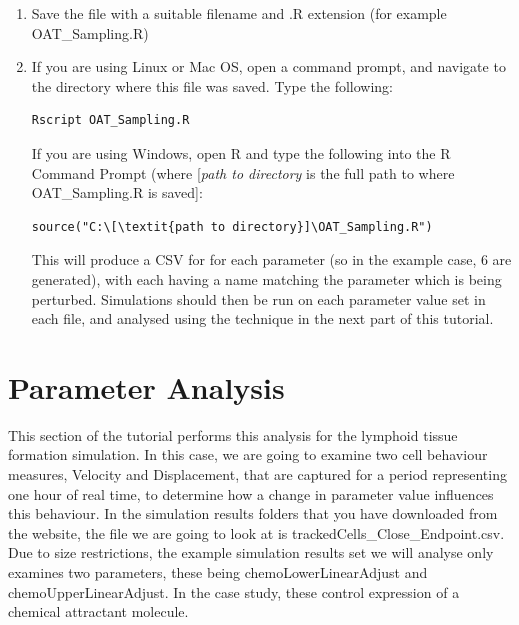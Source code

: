 \documentclass[a4paper,11pt]{article}
\begin{document}
\begin{enumerate}
\item Save the file with a suitable filename and .R extension (for example OAT\_Sampling.R)
\item If you are using Linux or Mac OS, open a command prompt, and navigate to the directory where this file was saved.  Type the following:

\begin{verbatim}
Rscript OAT_Sampling.R
\end{verbatim}

If you are using Windows, open R and type the following into the R Command Prompt (where [\textit{path to directory} is the full path to where OAT\_Sampling.R is saved]:

\begin{verbatim}
source("C:\[\textit{path to directory}]\OAT_Sampling.R")
\end{verbatim}

This will produce a CSV for for each parameter (so in the example case, 6 are generated), with each having a name matching the parameter which is being perturbed. Simulations should then be run on each parameter value set in each file, and analysed using the technique in the next part of this tutorial.

\end{enumerate}

\section{Parameter Analysis}
\noindent This section of the tutorial performs this analysis for the lymphoid tissue formation simulation. In this case, we are going to examine two cell behaviour measures, Velocity and Displacement, that are captured for a period representing one hour of real time, to determine how a change in parameter value influences this behaviour. In the simulation results folders that you have downloaded from the website, the file we are going to look at is trackedCells\_Close\_Endpoint.csv. Due to size restrictions, the example simulation results set we will analyse only examines two parameters, these being chemoLowerLinearAdjust and chemoUpperLinearAdjust. In the case study, these control expression of a chemical attractant molecule.
\end{document}
